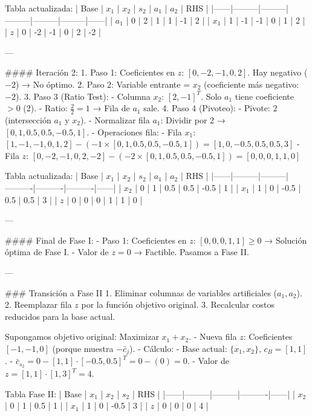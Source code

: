 Tabla actualizada:
| Base | \(x_1\) | \(x_2\) | \(s_2\) | \(a_1\) | \(a_2\) | RHS  |
|------|---------|---------|---------|---------|---------|------|
| \(a_1\) | 0       | 2       | 1       | 1       | -1      | 2    |
| \(x_1\) | 1       | -1      | -1      | 0       | 1       | 2    |
| \(z\)  | 0       | -2      | -1      | 0       | 2       | -2   |

---

#### Iteración 2:
1. Paso 1: Coeficientes en \(z\): \([0, -2, -1, 0, 2]\). Hay negativo (\(-2\)) → No óptimo.
2. Paso 2: Variable entrante = \(x_2\) (coeficiente más negativo: \(-2\)).
3. Paso 3 (Ratio Test):
   - Columna \(x_2\): \([2, -1]^T\). Solo \(a_1\) tiene coeficiente \(> 0\) (2).
   - Ratio: \(\frac{2}{2} = 1\) → Fila de \(a_1\) sale.
4. Paso 4 (Pivoteo):
   - Pivote: \(2\) (intersección \(a_1\) y \(x_2\)).
   - Normalizar fila \(a_1\): Dividir por 2 → \([0, 1, 0.5, 0.5, -0.5, 1]\).
   - Operaciones fila:
     - Fila \(x_1\): \([1, -1, -1, 0, 1, 2] - (-1 \times [0, 1, 0.5, 0.5, -0.5, 1]) = [1, 0, -0.5, 0.5, 0.5, 3]\)
     - Fila \(z\): \([0, -2, -1, 0, 2, -2] - (-2 \times [0, 1, 0.5, 0.5, -0.5, 1]) = [0, 0, 0, 1, 1, 0]\)

Tabla actualizada:
| Base | \(x_1\) | \(x_2\) | \(s_2\)  | \(a_1\)  | \(a_2\)  | RHS  |
|------|---------|---------|----------|----------|----------|------|
| \(x_2\) | 0       | 1       | 0.5      | 0.5      | -0.5     | 1    |
| \(x_1\) | 1       | 0       | -0.5     | 0.5      | 0.5      | 3    |
| \(z\)  | 0       | 0       | 0        | 1        | 1        | 0    |

---

#### Final de Fase I:
- Paso 1: Coeficientes en \(z\): \([0, 0, 0, 1, 1] \geq 0\) → Solución óptima de Fase I.
- Valor de \(z = 0\) → Factible. Pasamos a Fase II.

---

### Transición a Fase II
1. Eliminar columnas de variables artificiales (\(a_1, a_2\)).
2. Reemplazar fila \(z\) por la función objetivo original.
3. Recalcular costos reducidos para la base actual.

Supongamos objetivo original: Maximizar \(x_1 + x_2\).  
- Nueva fila \(z\): Coeficientes \([-1, -1, 0]\) (porque muestra \(-\bar{c}_j\)).
- Cálculo:
  - Base actual: \(\{x_1, x_2\}\), \(c_B = [1, 1]\).
  - \(\bar{c}_{s_2} = 0 - [1, 1] \cdot [-0.5, 0.5]^T = 0 - (0) = 0\).
  - Valor de \(z = [1, 1] \cdot [1, 3]^T = 4\).

Tabla Fase II:
| Base | \(x_1\) | \(x_2\) | \(s_2\)  | RHS  |
|------|---------|---------|----------|------|
| \(x_2\) | 0       | 1       | 0.5      | 1    |
| \(x_1\) | 1       | 0       | -0.5     | 3    |
| \(z\)  | 0       | 0       | 0        | 4    |

